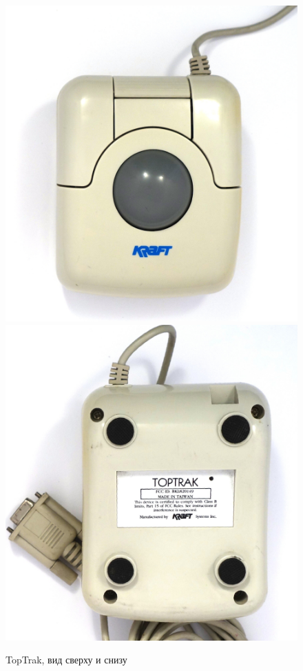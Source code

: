 \documentclass[11pt, a4paper]{article}
\begin{document}
\begin{figure}[h]
    \centering
    \includegraphics[scale=0.4]{1990_kraft_toptrack/2.9_60.jpg}
    \includegraphics[scale=0.4]{1990_kraft_toptrack/2.10_60.jpg}
    \caption{TopTrak, вид сверху и снизу}
    \label{fig:TopTrakTopAndBottom}
\end{figure}
\end{document}
